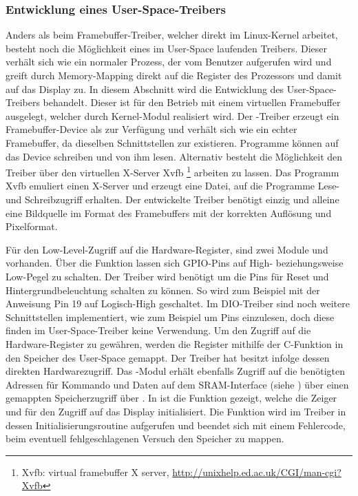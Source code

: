 \subsubsection{Entwicklung eines User-Space-Treibers}
\label{cha:userspace}
Anders als beim Framebuffer-Treiber, welcher direkt im Linux-Kernel arbeitet, besteht noch die Möglichkeit eines im User-Space laufenden Treibers. Dieser verhält sich wie ein normaler Prozess, der vom Benutzer aufgerufen wird und greift durch Memory-Mapping direkt auf die Register des Prozessors und damit auf das Display zu.
In diesem Abschnitt wird die Entwicklung des User-Space-Treibers behandelt. 
Dieser ist für den Betrieb mit einem virtuellen Framebuffer ausgelegt, welcher durch Kernel-Modul  realisiert wird. Der -Treiber erzeugt ein Framebuffer-Device als  zur Verfügung und verhält sich wie ein echter Framebuffer, da dieselben Schnittstellen zur existieren. Programme können auf das Device schreiben und von ihm lesen. Alternativ besteht die Möglichkeit den Treiber über den virtuellen X-Server Xvfb \footnote{Xvfb: virtual framebuffer X server, \url{http://unixhelp.ed.ac.uk/CGI/man-cgi?Xvfb}} arbeiten zu lassen. Das Programm Xvfb emuliert einen X-Server und erzeugt eine Datei, auf die Programme Lese- und Schreibzugriff erhalten. Der entwickelte Treiber benötigt einzig und alleine eine Bildquelle im Format des Framebuffers mit der korrekten Auflösung und Pixelformat. 

Für den Low-Level-Zugriff auf die Hardware-Register, sind zwei Module  und  vorhanden. Über die Funktion  lassen sich GPIO-Pins auf \linebreak High- beziehungsweise Low-Pegel zu schalten. Der Treiber wird benötigt um die Pins für Reset und Hintergrundbeleuchtung schalten zu können. So wird zum Beispiel mit der Anweisung  Pin 19 auf Logisch-High geschaltet.
Im DIO-Treiber sind noch weitere Schnittstellen implementiert, wie zum Beispiel  um Pins einzulesen, doch diese finden im User-Space-Treiber keine Verwendung. Um den Zugriff auf die Hardware-Register zu gewähren, werden die Register mithilfe der C-Funktion  in den Speicher des User-Space gemappt. Der Treiber hat besitzt infolge dessen direkten Hardwarezugriff.
Das -Modul erhält ebenfalls Zugriff auf die benötigten Adressen für Kommando und Daten auf dem SRAM-Interface (siehe ) über einen gemappten Speicherzugriff über . In  ist die Funktion  gezeigt, welche die Zeiger  und  für den Zugriff auf das Display initialisiert. Die Funktion wird im Treiber in dessen Initialisierungsroutine aufgerufen und beendet sich mit einem Fehlercode, beim eventuell fehlgeschlagenen Versuch den Speicher zu mappen.

